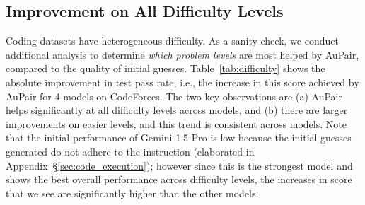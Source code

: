 \documentclass[11pt, a4paper, logo, copyright]{googledeepmind}
\def\aupair/{\textcolor{golden}{Au}Pair}
\def\aupairs/{\textcolor{golden}{Au}Pairs}
\begin{document}
\begin{table}[t]
\centering
{}
\caption{\textbf{Difficulty-wise analysis:} test pass rate using \aupairs/, categorised by difficulty level from easy (A) to hard (F+), accompanied by number of problems. Absolute improvement in parentheses. We see an expected trend here: the strongest performance is observed using the best models on the easiest problems, and as difficulty increases, performance decreases across models. However, our results with Gemini-1.5-Pro indicate improved performance with higher difficulty}
\label{tab:difficulty}
\end{table}


\subsection{Improvement on All Difficulty Levels}

Coding datasets have heterogeneous difficulty. As a sanity check, we conduct additional analysis to determine \emph{which problem levels} are most helped by \aupair/, compared to the quality of initial guesses. Table~\ref{tab:difficulty} shows the absolute improvement in test pass rate, i.e., the increase in this score achieved by \aupair/ for 4 models on CodeForces. The two key observations are (a) \aupair/ helps significantly at all difficulty levels across models, and (b) there are larger improvements on easier levels, and this trend is consistent across models. Note that the initial performance of Gemini-1.5-Pro is low because the initial guesses generated do not adhere to the instruction (elaborated in Appendix~\S\ref{sec:code_execution}); however since this is the strongest model and shows the best overall performance across difficulty levels, the increases in score that we see are significantly higher than the other models.
\end{document}
